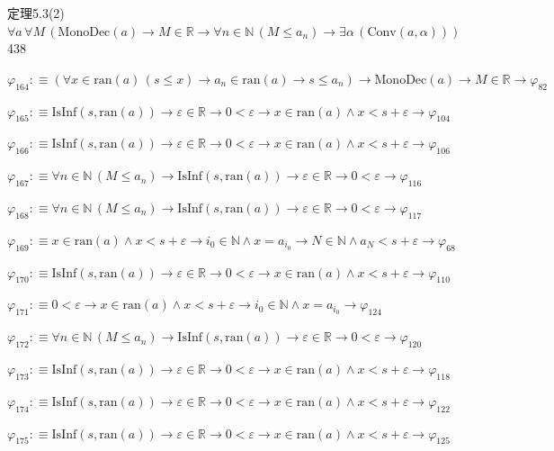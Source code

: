 \begin{fullproof}{定理5.3(2)}{$\forall a\,\forall M\,(\mathrm{MonoDec}(a) \to M \in \mathbb{R} \to \forall n \in \mathbb{N}\,(M \leq a_{n}) \to \exists \alpha\,(\mathrm{Conv}(a,\alpha)))$}{438}
\begin{abbrevlist}
\item $\varphi_{164} :\equiv (\forall x \in \mathrm{ran}(a)\,(s \leq x) \to a_{n} \in \mathrm{ran}(a) \to s \leq a_{n}) \to \mathrm{MonoDec}(a) \to M \in \mathbb{R} \to \varphi_{82}$
\item $\varphi_{165} :\equiv \mathrm{IsInf}(s,\mathrm{ran}(a)) \to \varepsilon \in \mathbb{R} \to 0 < \varepsilon \to x \in \mathrm{ran}(a) \land x < s + \varepsilon \to \varphi_{104}$
\item $\varphi_{166} :\equiv \mathrm{IsInf}(s,\mathrm{ran}(a)) \to \varepsilon \in \mathbb{R} \to 0 < \varepsilon \to x \in \mathrm{ran}(a) \land x < s + \varepsilon \to \varphi_{106}$
\item $\varphi_{167} :\equiv \forall n \in \mathbb{N}\,(M \leq a_{n}) \to \mathrm{IsInf}(s,\mathrm{ran}(a)) \to \varepsilon \in \mathbb{R} \to 0 < \varepsilon \to \varphi_{116}$
\item $\varphi_{168} :\equiv \forall n \in \mathbb{N}\,(M \leq a_{n}) \to \mathrm{IsInf}(s,\mathrm{ran}(a)) \to \varepsilon \in \mathbb{R} \to 0 < \varepsilon \to \varphi_{117}$
\item $\varphi_{169} :\equiv x \in \mathrm{ran}(a) \land x < s + \varepsilon \to i_{0} \in \mathbb{N} \land x = a_{i_{0}} \to N \in \mathbb{N} \land a_{N} < s + \varepsilon \to \varphi_{68}$
\item $\varphi_{170} :\equiv \mathrm{IsInf}(s,\mathrm{ran}(a)) \to \varepsilon \in \mathbb{R} \to 0 < \varepsilon \to x \in \mathrm{ran}(a) \land x < s + \varepsilon \to \varphi_{110}$
\item $\varphi_{171} :\equiv 0 < \varepsilon \to x \in \mathrm{ran}(a) \land x < s + \varepsilon \to i_{0} \in \mathbb{N} \land x = a_{i_{0}} \to \varphi_{124}$
\item $\varphi_{172} :\equiv \forall n \in \mathbb{N}\,(M \leq a_{n}) \to \mathrm{IsInf}(s,\mathrm{ran}(a)) \to \varepsilon \in \mathbb{R} \to 0 < \varepsilon \to \varphi_{120}$
\item $\varphi_{173} :\equiv \mathrm{IsInf}(s,\mathrm{ran}(a)) \to \varepsilon \in \mathbb{R} \to 0 < \varepsilon \to x \in \mathrm{ran}(a) \land x < s + \varepsilon \to \varphi_{118}$
\item $\varphi_{174} :\equiv \mathrm{IsInf}(s,\mathrm{ran}(a)) \to \varepsilon \in \mathbb{R} \to 0 < \varepsilon \to x \in \mathrm{ran}(a) \land x < s + \varepsilon \to \varphi_{122}$
\item $\varphi_{175} :\equiv \mathrm{IsInf}(s,\mathrm{ran}(a)) \to \varepsilon \in \mathbb{R} \to 0 < \varepsilon \to x \in \mathrm{ran}(a) \land x < s + \varepsilon \to \varphi_{125}$

\end{abbrevlist}
\end{fullproof}
